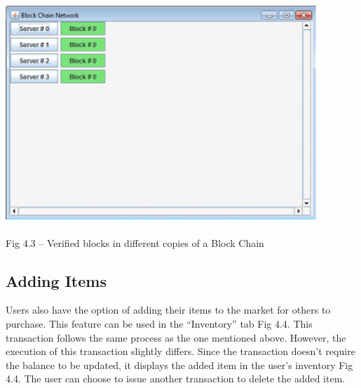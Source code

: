 \documentclass{article} %
\begin{document}
\noindent \begin{flushleft}

\end{flushleft}

\noindent \begin{center}
\includegraphics*[bb=0 0 4.67in 3.23in, width=4.67in, height=3.23in, keepaspectratio=false]{image3.png}

\noindent Fig 4.3 -- Verified blocks in different copies of a Block Chain
\end{center}

\noindent \begin{flushleft}

\end{flushleft}

\noindent 
\subsection{Adding Items}

\begin{flushleft}
Users also have the option of adding their items to the market for others to purchase. This feature can be used in the ``Inventory'' tab Fig 4.4. This transaction follows the same process as the one mentioned above. However, the execution of this transaction slightly differs. Since the transaction doesn't require the balance to be updated, it displays the added item in the user's inventory Fig 4.4. The user can choose to issue another transaction to delete the added item.
\end{flushleft}
\end{document}

